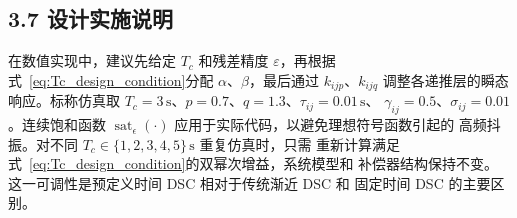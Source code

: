 \documentclass{article}
\begin{document}
\subsection{3.7 设计实施说明}
\label{subsec:implementation_notes}

在数值实现中，建议先给定 $T_c$ 和残差精度 $\varepsilon$，再根据
式~\eqref{eq:Tc_design_condition}分配 $\alpha$、$\beta$，最后通过
$k_{ijp}$、$k_{ijq}$ 调整各递推层的瞬态响应。标称仿真取
$T_c=3\,\mathrm{s}$、$p=0.7$、$q=1.3$、$\tau_{ij}=0.01\,\mathrm{s}$、
$\gamma_{ij}=0.5$、$\sigma_{ij}=0.01$。连续饱和函数
$\operatorname{sat}_{\epsilon}(\cdot)$ 应用于实际代码，以避免理想符号函数引起的
高频抖振。对不同 $T_c\in\{1,2,3,4,5\}\,\mathrm{s}$ 重复仿真时，只需
重新计算满足式~\eqref{eq:Tc_design_condition}的双幂次增益，系统模型和
补偿器结构保持不变。这一可调性是预定义时间 DSC 相对于传统渐近 DSC 和
固定时间 DSC 的主要区别。
\end{document}
